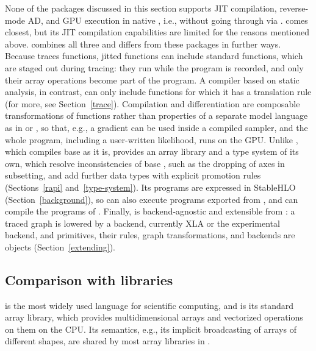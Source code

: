 \documentclass[article,shortnames]{jss}
\begin{document}
None of the packages discussed in this section supports JIT compilation, reverse-mode AD, and GPU execution in native , i.e., without going through  via .
 comes closest, but its JIT compilation capabilities are limited for the reasons mentioned above.
 combines all three and differs from these packages in further ways.
Because  traces  functions, jitted functions can include standard  functions, which are staged out during tracing: they run while the program is recorded, and only their array operations become part of the program.
A compiler based on static analysis, in contrast, can only include functions for which it has a translation rule (for more, see Section~\ref{trace}).
Compilation and differentiation are composable transformations of  functions rather than properties of a separate model language as in  or , so that, e.g., a gradient can be used inside a compiled sampler, and the whole program, including a user-written likelihood, runs on the GPU.
Unlike , which compiles base  as it is,  provides an array library and a type system of its own, which resolve inconsistencies of base , such as the dropping of axes in subsetting, and add further data types with explicit promotion rules (Sections~\ref{rapi} and~\ref{type-system}).
Its programs are expressed in StableHLO (Section~\ref{background}), so  can also execute programs exported from , and  can compile the programs of .
Finally,  is backend-agnostic and extensible from : a traced graph is lowered by a backend, currently XLA or the experimental  backend, and primitives, their rules, graph transformations, and backends are  objects (Section~\ref{extending}).


\subsection[Comparison with Python libraries]{Comparison with  libraries}\label{comparison-jax}

 is the most widely used language for scientific computing, and  \citep{ref-harris2020array} is its standard array library, which provides multidimensional arrays and vectorized operations on them on the CPU.
Its semantics, e.g., its implicit broadcasting of arrays of different shapes, are shared by most array libraries in .
\end{document}
